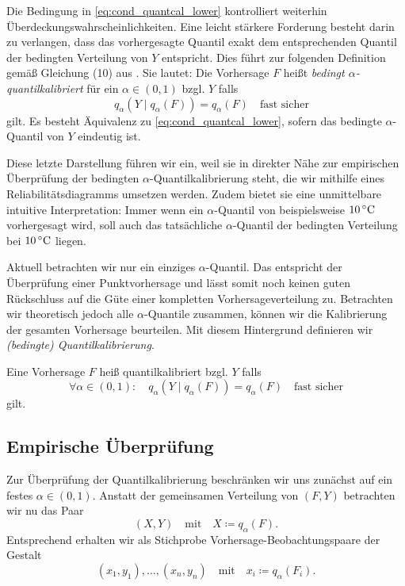 \begin{defi}
Die Bedingung in \eqref{eq:cond_quantcal_lower} kontrolliert weiterhin Überdeckungswahrscheinlichkeiten. Eine leicht stärkere Forderung besteht darin zu verlangen, dass das vorhergesagte Quantil exakt dem entsprechenden Quantil der bedingten Verteilung von $Y$ entspricht. Dies führt zur folgenden Definition gemäß Gleichung (10) aus \textcite{arnold2025isotonic}. Sie lautet: Die Vorhersage $F$ heißt \emph{bedingt $\alpha$-quantilkalibriert} für ein $\alpha \in (0,1)$ bzgl. $Y$ falls
\begin{equation}\label{eq:cond_alpha_quant_cal}
\quad q_\alpha\left(Y \mid q_\alpha(F)\right) = q_\alpha(F)\quad \text{fast sicher}
\end{equation}
gilt. Es besteht Äquivalenz zu \eqref{eq:cond_quantcal_lower}, sofern das bedingte $\alpha$-Quantil von $Y$ eindeutig ist. 

Diese letzte Darstellung führen wir ein, weil sie in direkter Nähe zur empirischen Überprüfung der bedingten $\alpha$-Quantilkalibrierung steht, die wir mithilfe eines Reliabilitätsdiagramms umsetzen werden. Zudem bietet sie eine unmittelbare intuitive Interpretation: Immer wenn ein $\alpha$-Quantil von beispielsweise $10\,^\circ\mathrm{C}$ vorhergesagt wird, soll auch das tatsächliche $\alpha$-Quantil der bedingten Verteilung bei $10\,^\circ\mathrm{C}$ liegen.
\end{defi}{}

Aktuell betrachten wir nur ein einziges $\alpha$-Quantil. Das entspricht der Überprüfung einer Punktvorhersage und lässt somit noch keinen guten Rückschluss auf die Güte einer kompletten Vorhersageverteilung zu. Betrachten wir theoretisch jedoch alle $\alpha$-Quantile zusammen, können wir die Kalibrierung der gesamten Vorhersage beurteilen. Mit diesem Hintergrund definieren wir  \emph{(bedingte) Quantilkalibrierung}.
\begin{defi} \label{def:all_quantcal}
Eine Vorhersage $F$ heiß quantilkalibriert bzgl. $Y$ falls
\[
\forall \alpha \in (0,1): \quad q_\alpha\left(Y\mid q_\alpha(F)\right) = q_\alpha(F)\quad \text{fast sicher}
\]
gilt.
\end{defi}


\subsection{Empirische Überprüfung}\label{sec:emp_prüf_quantcal}
Zur Überprüfung der Quantilkalibrierung beschränken wir uns zunächst auf ein festes $\alpha \in (0,1)$. Anstatt der gemeinsamen Verteilung von $(F,Y)$ betrachten wir nu das Paar
\begin{equation} \label{eq:qaunt_stich_pop}
 (X,Y) \quad \text{mit} \quad X \coloneqq q_\alpha(F).   
\end{equation}
Entsprechend erhalten wir als Stichprobe Vorhersage-Beobachtungspaare der Gestalt
\begin{equation} \label{eq:qaunt_stich_emp}
    (x_1, y_1), \dotsc, (x_n, y_n) \quad \text{mit} \quad x_i \coloneqq q_\alpha(F_i).
\end{equation}

